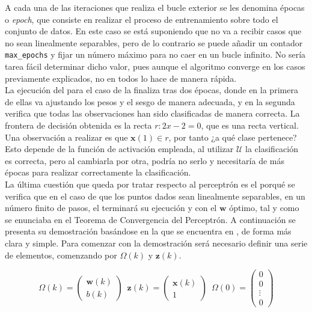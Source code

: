 		A cada una de las iteraciones que realiza el bucle exterior se les denomina épocas o \textit{epoch}, que consiste en realizar el proceso de entrenamiento sobre todo el conjunto de datos. En este caso se está suponiendo que no va a recibir casos que no sean linealmente separables, pero de lo contrario se puede añadir un contador \texttt{max\_epochs} y fijar un número máximo para no caer en un bucle infinito. No sería tarea fácil determinar dicho valor, pues aunque el algoritmo converge en los casos previamente explicados, no en todos lo hace de manera rápida. \\
		
		La ejecución del  para el caso de la  finaliza tras dos épocas, donde en la primera de ellas va ajustando los pesos y el sesgo de manera adecuada, y en la segunda verifica que todas las observaciones han sido clasificadas de manera correcta. La frontera de decisión obtenida es la recta $r: 2x - 2 = 0$, que es una recta vertical. Una observación a realizar es que $\textbf{x}(1) \in r$, por tanto ¿a qué clase pertenece? Esto depende de la función de activación empleada, al utilizar $\mathcal{U}$ la clasificación es correcta, pero al cambiarla por otra, podría no serlo y necesitaría de más épocas para realizar correctamente la clasificación. \\
		
		La última cuestión que queda por tratar respecto al perceptrón es el porqué se verifica que en el caso de que los puntos dados sean linealmente separables, en un número finito de pasos, el  terminará su ejecución y con el $\textbf{w}$ óptimo, tal y como se enunciaba en el Teorema de Convergencia del Perceptrón. A continuación se presenta su demostración basándose en la que se encuentra en \cite{nndesign}, de forma más clara y simple. Para comenzar con la demostración será necesario definir una serie de elementos, comenzando por $\Omega(k)$ y $\textbf{z}(k)$.  
		
		$$
		\Omega(k) = \left(\begin{array}{c}
			\textbf{w}(k)\\\hline
			b(k)
		\end{array}\right) \,\,\, \textbf{z}(k) = \left(\begin{array}{c}
		\textbf{x}(k)\\\hline
		1
		\end{array}\right)
		 \,\,\, \Omega(0) = \begin{pmatrix}
			0\\0\\\vdots\\0
		\end{pmatrix}
		$$
		
